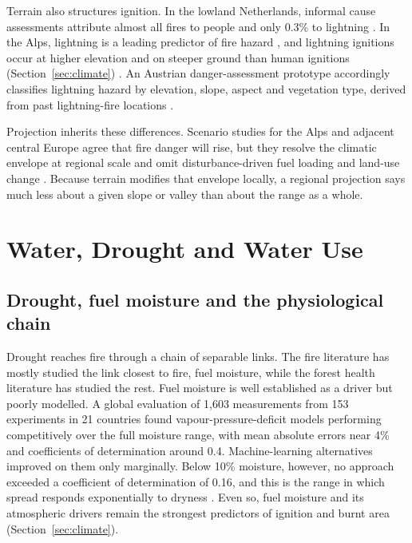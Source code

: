 \documentclass[11pt,a4paper]{article}
\begin{document}
Terrain also structures ignition. In the lowland Netherlands, informal cause assessments attribute almost all fires to people and only 0.3\% to lightning \citep{stoof_temperate_2024}. In the Alps, lightning is a leading predictor of fire hazard \citep{gerberding_mapping_2025}, and lightning ignitions occur at higher elevation and on steeper ground than human ignitions (Section~\ref{sec:climate}) \citep{conedera_lightninginduced_2006}. An Austrian danger-assessment prototype accordingly classifies lightning hazard by elevation, slope, aspect and vegetation type, derived from past lightning-fire locations \citep{muller_towards_2020}.

Projection inherits these differences. Scenario studies for the Alps and adjacent central Europe agree that fire danger will rise, but they resolve the climatic envelope at regional scale and omit disturbance-driven fuel loading and land-use change \citep{gerberding_mapping_2025, miller_climate_2024}. Because terrain modifies that envelope locally, a regional projection says much less about a given slope or valley than about the range as a whole.

\section{Water, Drought and Water Use}
\label{sec:water}

\subsection{Drought, fuel moisture and the physiological chain}

Drought reaches fire through a chain of separable links. The fire literature has mostly studied the link closest to fire, fuel moisture, while the forest health literature has studied the rest. Fuel moisture is well established as a driver but poorly modelled. A global evaluation of 1{,}603 measurements from 153 experiments in 21 countries found vapour-pressure-deficit models performing competitively over the full moisture range, with mean absolute errors near 4\% and coefficients of determination around 0.4. Machine-learning alternatives improved on them only marginally. Below 10\% moisture, however, no approach exceeded a coefficient of determination of 0.16, and this is the range in which spread responds exponentially to dryness \citep{rodrigues_vpdbased_2024}. Even so, fuel moisture and its atmospheric drivers remain the strongest predictors of ignition and burnt area (Section~\ref{sec:climate}).
\end{document}
